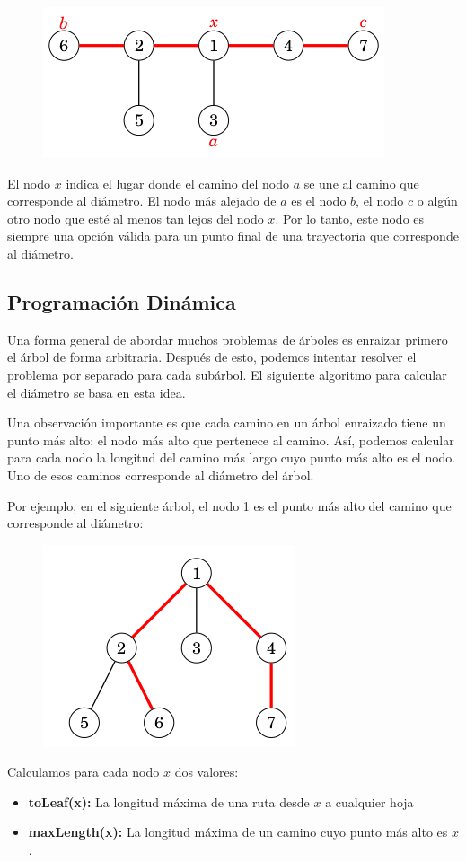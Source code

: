 \begin{figure}[h!]
	\centering
	\includegraphics[width=0.5\linewidth]{img/diameter_tree_4}
	\label{fig:diametertree4}
\end{figure}

El nodo $x$ indica el lugar donde el camino del nodo $a$ se une al camino que corresponde al diámetro. El nodo más alejado de $a$ es el nodo $b$, el nodo $c$ o algún otro nodo que esté al menos tan lejos del nodo $x$. Por lo tanto, este nodo es siempre una opción válida para un punto final de una trayectoria que corresponde al diámetro.

\subsection{Programación Dinámica}

Una forma general de abordar muchos problemas de árboles es enraizar primero el árbol de forma arbitraria. Después de esto, podemos intentar resolver el problema por separado para cada subárbol. El siguiente algoritmo para calcular el diámetro se basa en esta idea.

Una observación importante es que cada camino en un árbol enraizado tiene un punto más alto: el nodo más alto que pertenece al camino. Así, podemos calcular para cada nodo la longitud del camino más largo cuyo punto más alto es el nodo. Uno de esos caminos corresponde al diámetro del árbol.

Por ejemplo, en el siguiente árbol, el nodo 1 es el punto más alto del camino que corresponde al diámetro:

\begin{figure}[h!]
	\centering
	\includegraphics[width=0.5\linewidth]{img/diameter_tree_5}
	\label{fig:diametertree5}
\end{figure}

Calculamos para cada nodo $x$ dos valores:

\begin{itemize}
	\item \textbf{toLeaf(x):} La longitud máxima de una ruta desde $x$ a cualquier hoja
	\item \textbf{maxLength(x):} La longitud máxima de un camino cuyo punto más alto es $x$.
\end{itemize}
